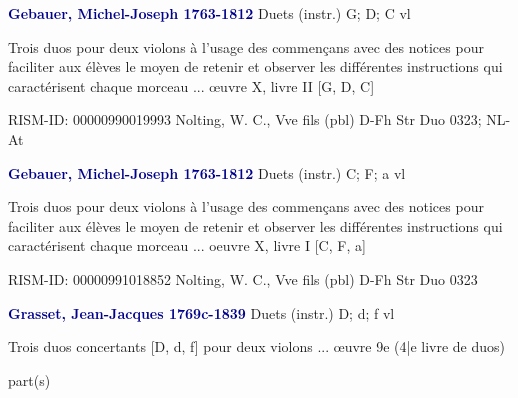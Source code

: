 \documentclass[twocolumn]{book}
\begin{document}
\newline \par \vspace{7pt} \textcolor{darkblue}{\textbf{Gebauer, Michel-Joseph  1763-1812}}
\newline Duets (instr.)  G; D; C  
 vl
\newline \begin{itshape}Trois duos pour deux violons à l'usage des commençans avec des notices pour faciliter aux élèves le moyen de retenir et observer les différentes instructions qui caractérisent chaque morceau ... œuvre X, livre II [G, D, C]\end{itshape} 
\newline RISM-ID: 00000990019993
\newline Nolting, W. C., Vve  fils  (pbl)
\newline D-Fh  Str Duo 0323; NL-At
\newline \par \vspace{7pt} \textcolor{darkblue}{\textbf{Gebauer, Michel-Joseph  1763-1812}}
\newline Duets (instr.)  C; F; a  
 vl
\newline \begin{itshape}Trois duos pour deux violons à l'usage des commençans avec des notices pour faciliter aux élèves le moyen de retenir et observer les différentes instructions qui caractérisent chaque morceau ... oeuvre X, livre I [C, F, a]\end{itshape} 
\newline RISM-ID: 00000991018852
\newline Nolting, W. C., Vve  fils  (pbl)
\newline D-Fh  Str Duo 0323
\newline \par \vspace{7pt} \textcolor{darkblue}{\textbf{Grasset, Jean-Jacques  1769c-1839}}
\newline Duets (instr.)  D; d; f  
 vl
\newline \begin{itshape}Trois duos concertants [D, d, f] pour deux violons ... œuvre 9e (4|e livre de duos)\end{itshape} 
\newline \textcolor{darkblue}{}  part(s)  
\end{document}
